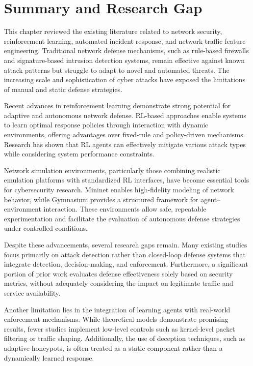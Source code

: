 \documentclass[12pt,a4paper]{report}
\begin{document}
\section{Summary and Research Gap}

This chapter reviewed the existing literature related to network security, reinforcement learning, automated incident response, and network traffic feature engineering.
Traditional network defense mechanisms, such as rule-based firewalls and signature-based intrusion detection systems, remain effective against known attack patterns but struggle to adapt to novel and automated threats.
The increasing scale and sophistication of cyber attacks have exposed the limitations of manual and static defense strategies.

Recent advances in reinforcement learning demonstrate strong potential for adaptive and autonomous network defense.
RL-based approaches enable systems to learn optimal response policies through interaction with dynamic environments, offering advantages over fixed-rule and policy-driven mechanisms.
Research has shown that RL agents can effectively mitigate various attack types while considering system performance constraints.

Network simulation environments, particularly those combining realistic emulation platforms with standardized RL interfaces, have become essential tools for cybersecurity research.
Mininet enables high-fidelity modeling of network behavior, while Gymnasium provides a structured framework for agent–environment interaction.
These environments allow safe, repeatable experimentation and facilitate the evaluation of autonomous defense strategies under controlled conditions.

Despite these advancements, several research gaps remain.
Many existing studies focus primarily on attack detection rather than closed-loop defense systems that integrate detection, decision-making, and enforcement.
Furthermore, a significant portion of prior work evaluates defense effectiveness solely based on security metrics, without adequately considering the impact on legitimate traffic and service availability.

Another limitation lies in the integration of learning agents with real-world enforcement mechanisms.
While theoretical models demonstrate promising results, fewer studies implement low-level controls such as kernel-level packet filtering or traffic shaping.
Additionally, the use of deception techniques, such as adaptive honeypots, is often treated as a static component rather than a dynamically learned response.
\end{document}
